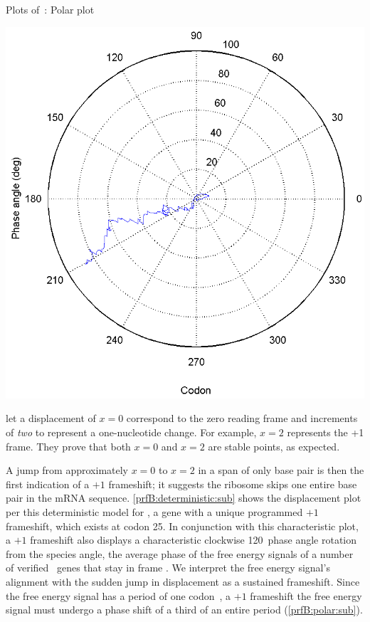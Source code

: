 \documentclass[twocolumn]{article}
\begin{document}
\begin{cfigure}
  \caption{Plots of~\prfB: Polar plot}
  \label{prfB:polar:sub}
  \includegraphics[width=\linewidth]{prfB/polar}
\end{cfigure}

\citeauthor{lalit:mechanics} let a displacement of $x = 0$ correspond
to the zero reading frame and increments of \emph{two} to represent a
one-nucleotide change. For example, $x =2$ represents the +1 frame.
They prove that both $x = 0$ and $x = 2$ are
stable points, as expected.

A jump from approximately $x = 0$ to $x = 2$ in a span of only
base pair is then the first indication of a $+1$ frameshift; it
suggests the ribosome skips one entire base pair in the mRNA sequence.
\autoref{prfB:deterministic:sub} shows the displacement plot per this
deterministic model for \prfB, a gene with a unique programmed $+1$
frameshift, which exists at codon 25. In conjunction with this
characteristic plot, a $+1$ frameshift also displays a 
characteristic clockwise 120\degree\ phase angle rotation from the
species angle, the average phase of the free energy signals of a
number of verified \ecoli\ genes that stay in frame
\cite{lalit:mechanics}.  We interpret the free energy signal's
alignment with the sudden jump in displacement as a sustained
frameshift. Since the free energy signal has a period of one
codon~\cite{lalit:mechanics}, a $+1$ frameshift the free energy signal
must undergo a phase shift of a third of an entire period
(\autoref{prfB:polar:sub}).
\end{document}
